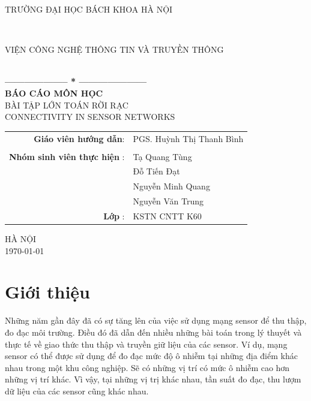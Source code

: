 \documentclass[12pt]{report}
\begin{document}
\thispagestyle{empty}
\thisfancypage{
\setlength{\fboxsep}{0pt}
\fbox}{} 
\begin{center}
\begin{large}

TRƯỜNG ĐẠI HỌC BÁCH KHOA HÀ NỘI
\end{large} \\
\begin{large}
VIỆN CÔNG NGHỆ THÔNG TIN VÀ TRUYỀN THÔNG
\end{large} \\
\textbf{--------------------  *  ---------------------}\\[5.5cm]
{\fontsize{30pt}{1}\selectfont \textbf{BÁO CÁO MÔN HỌC}}\\
{\fontsize{20pt}{1}\selectfont BÀI TẬP LỚN TOÁN RỜI RẠC}\\[5mm]
{\fontsize{18pt}{1}\selectfont CONNECTIVITY IN SENSOR NETWORKS}\\
[2cm]


\begin{tabular}{ r l}
\textbf{Giáo viên hướng dẫn}:& PGS. Huỳnh Thị Thanh Bình\\
\\
\textbf{Nhóm sinh viên thực hiện} :& Tạ Quang Tùng \\ 
 					 		  & Đỗ Tiến Đạt \\
 					          & Nguyễn Minh Quang\\	
 					          & Nguyễn Văn Trung \\
\textbf{Lớp} :& KSTN CNTT K60 \\ 
\end{tabular} 
\vspace{3.7cm}

{\fontsize{14pt}{1}\selectfont  HÀ NỘI}\\
{\fontsize{14pt}{1}\selectfont \today}
\end{center}
\newpage

\tableofcontents
\newpage 

\section{Giới thiệu}
Những năm gần đây đã có sự tăng lên của việc sử dụng mạng sensor để thu thập, đo đạc môi trường. Điều đó đã dẫn đến nhiều những bài toán trong lý thuyết và thực tế về giao thức thu thập và truyền giữ liệu của các sensor.  Ví dụ, mạng sensor có thể được sử dụng để đo đạc mức độ ô nhiễm tại những địa điểm khác nhau trong một khu công nghiệp. Sẽ có những vị trí có mức ô nhiễm cao hơn những vị trí khác. Vì vậy, tại những vị trị khác nhau, tần suất đo đạc, thu lượm dữ liệu của các sensor cũng khác nhau. \cite{somasundara2004mobile}
	
\end{document}
